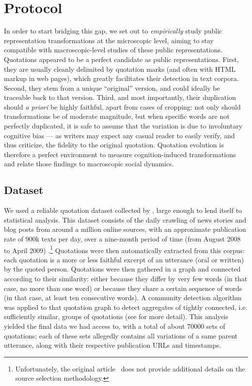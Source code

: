 \section{Protocol} %
\label{sec:protocol}

In order to start bridging this gap, we set out to \emph{empirically} study public representation transformations at the microscopic level, aiming to stay compatible with macroscopic-level studies of these public representations.
Quotations appeared to be a perfect candidate as public representations.
First, they are usually cleanly delimited by quotation marks (and often with HTML markup in web pages), which greatly facilitates their detection in text corpora.
Second, they stem from a unique ``original'' version, and could ideally be traceable back to that version.
Third, and most importantly, their duplication should \emph{a priori} be highly faithful, apart from cases of cropping: not only should transformations be of moderate magnitude, but when specific words are not perfectly duplicated, it is safe to assume that the variation is due to involuntary cognitive bias --- as writers may expect any casual reader to easily verify, and thus criticize, the fidelity to the original quotation.
Quotation evolution is therefore a perfect environment to measure cognition-induced transformations and relate those findings to macroscopic social dynamics.

\subsection{Dataset}

We used a reliable quotation dataset collected by \citet{Leskovec09}, large enough to lend itself to statistical analysis.
This dataset consists of the daily crawling of news stories and blog posts from around a million online sources, with an approximate publication rate of 900k texts per day, over a nine-month period of time (from August 2008 to April 2009) \cite{Leskovec09-url}.\footnote{Unfortunately, the original article~\citep{Leskovec09} does not provide additional details on the source selection methodology.}
Quotations were then automatically extracted from this corpus: each quotation is a more or less faithful excerpt of an utterance (oral or written) by the quoted person. 
Quotations were then gathered in a graph and connected according to their similarity: either because they differ by very few words (in that case, no more than one word) or because they share a certain sequence of words (in that case, at least ten consecutive words).
A community detection algorithm was applied to that quotation graph to detect aggregates of tightly connected, i.e. sufficiently similar, groups of quotations (see \citet{Leskovec09} for more detail).
This analysis yielded the final data we had access to, with a total of about \num{70000} sets of quotations; each of these sets allegedly contains all variations of a same parent utterance, along with their respective publication URLs and timestamps.

